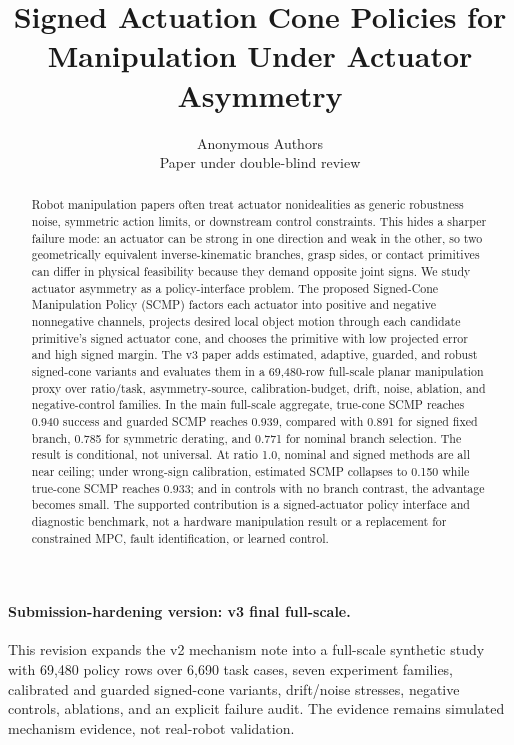 \documentclass{article}
\title{Signed Actuation Cone Policies for Manipulation Under Actuator Asymmetry}
\author{Anonymous Authors\\Paper under double-blind review}
\begin{document}
\maketitle

\paragraph{Submission-hardening version: v3 final full-scale.}
This revision expands the v2 mechanism note into a full-scale synthetic study with 69,480 policy rows over 6,690 task cases, seven experiment families, calibrated and guarded signed-cone variants, drift/noise stresses, negative controls, ablations, and an explicit failure audit. The evidence remains simulated mechanism evidence, not real-robot validation.

\begin{abstract}
Robot manipulation papers often treat actuator nonidealities as generic robustness noise, symmetric action limits, or downstream control constraints. This hides a sharper failure mode: an actuator can be strong in one direction and weak in the other, so two geometrically equivalent inverse-kinematic branches, grasp sides, or contact primitives can differ in physical feasibility because they demand opposite joint signs. We study actuator asymmetry as a policy-interface problem. The proposed Signed-Cone Manipulation Policy (SCMP) factors each actuator into positive and negative nonnegative channels, projects desired local object motion through each candidate primitive's signed actuator cone, and chooses the primitive with low projected error and high signed margin. The v3 paper adds estimated, adaptive, guarded, and robust signed-cone variants and evaluates them in a 69,480-row full-scale planar manipulation proxy over ratio/task, asymmetry-source, calibration-budget, drift, noise, ablation, and negative-control families. In the main full-scale aggregate, true-cone SCMP reaches 0.940 success and guarded SCMP reaches 0.939, compared with 0.891 for signed fixed branch, 0.785 for symmetric derating, and 0.771 for nominal branch selection. The result is conditional, not universal. At ratio 1.0, nominal and signed methods are all near ceiling; under wrong-sign calibration, estimated SCMP collapses to 0.150 while true-cone SCMP reaches 0.933; and in controls with no branch contrast, the advantage becomes small. The supported contribution is a signed-actuator policy interface and diagnostic benchmark, not a hardware manipulation result or a replacement for constrained MPC, fault identification, or learned control.
\end{abstract}
\end{document}
